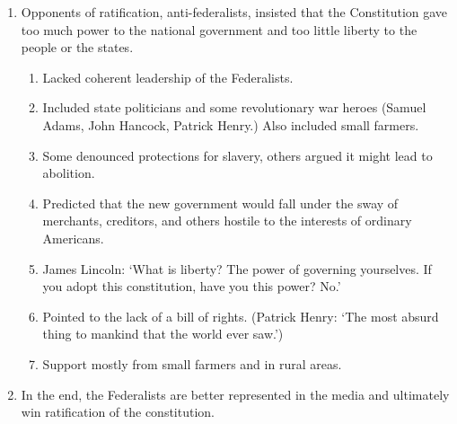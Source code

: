\documentclass{article}
\begin{document}
\begin{enumerate}
        \item Opponents of ratification, anti-federalists, insisted that the Constitution gave too much power to the national government and too little liberty to the people or the states.
          \begin{enumerate}
            \item Lacked coherent leadership of the Federalists.
            \item Included state politicians and some revolutionary war heroes (Samuel Adams, John Hancock, Patrick Henry.) Also included small farmers.
            \item Some denounced protections for slavery, others argued it might lead to abolition.
            \item Predicted that the new government would fall under the sway of merchants, creditors, and others hostile to the interests of ordinary Americans.
            \item James Lincoln: `What is liberty? The power of governing yourselves. If you adopt this constitution, have you this power? No.'
            \item Pointed to the lack of a bill of rights. (Patrick Henry: `The most absurd thing to mankind that the world ever saw.')
            \item Support mostly from small farmers and in rural areas.
          \end{enumerate}

        \item In the end, the Federalists are better represented in the media and ultimately win ratification of the constitution.
      \end{enumerate}
\end{document}
